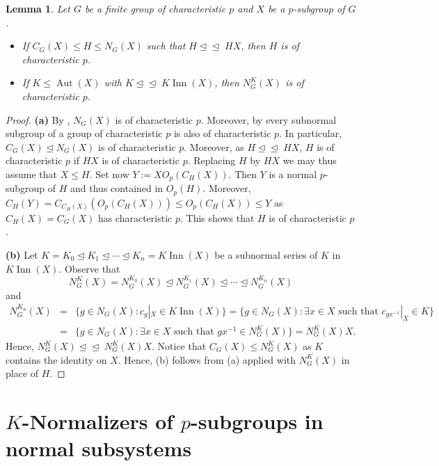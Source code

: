 \documentclass[reqno,11pt]{amsart}
\numberwithin{equation}{section}
\newtheorem{lemma}[equation]{Lemma}
\theoremstyle{definition}
\newcommand{\Aut}{\operatorname{Aut}}
\newcommand{\Inn}{\operatorname{Inn}}
\newcommand{\subn}{\unlhd\!\unlhd\;}
\begin{document}
\begin{lemma}\label{L:KnormalizerInGroup}
 Let $G$ be a finite group of characteristic $p$ and $X$ be a $p$-subgroup of $G$.
\begin{itemize}
 \item [(a)] If $C_G(X)\leq H\leq N_G(X)$ such that $H\subn HX$, then $H$ is of characteristic $p$.
 \item [(b)] If $K\leq \Aut(X)$ with $K\subn K\Inn(X)$, then $N_G^K(X)$ is of characteristic $p$. 
\end{itemize} 
\end{lemma}

\begin{proof}
\textbf{(a)} By \cite[Lemma~1.2(c)]{MS:2012b}, $N_G(X)$ is of characteristic $p$. Moreover, by \cite[Lemma~1.2(a)]{MS:2012b} every subnormal subgroup of a group of characteristic $p$ is also of characteristic $p$. In particular, $C_G(X)\unlhd N_G(X)$ is of characteristic $p$. Moreover, as $H\subn HX$, $H$ is of characteristic $p$ if $HX$ is of characteristic $p$. Replacing $H$ by $HX$ we may thus assume that $X\leq H$. Set now $Y:=XO_p(C_H(X))$. Then $Y$ is a normal $p$-subgroup of $H$ and thus contained in $O_p(H)$. Moreover, $C_H(Y)=C_{C_H(X)}(O_p(C_H(X)))\leq O_p(C_H(X))\leq Y$ as $C_H(X)=C_G(X)$ has characteristic $p$. This shows that $H$ is of characteristic $p$.

\smallskip

\textbf{(b)} Let $K=K_0\unlhd K_1\unlhd\cdots\unlhd K_n=K\Inn(X)$ be a subnormal series of $K$ in $K\Inn(X)$. Observe that
\[N_G^K(X)=N_G^{K_0}(X)\unlhd N_G^{K_1}(X)\unlhd\cdots \unlhd N_G^{K_n}(X)\]
and 
\begin{eqnarray*}
 N_G^{K_n}(X)&=&\{g\in N_G(X)\colon c_g|_X\in K\Inn(X)\}=\{g\in N_G(X)\colon \exists x\in X\mbox{ such that }c_{gx^{-1}}|_X\in K\}\\
&=&\{g\in N_G(X)\colon \exists x\in X\mbox{ such that }gx^{-1}\in N_G^K(X)\}=N_G^K(X)X.
\end{eqnarray*}
Hence, $N_G^K(X)\subn N_G^K(X)X$. Notice that $C_G(X)\leq N_G^K(X)$ as $K$ contains the identity on $X$. Hence, (b) follows from (a) applied with $N_G^K(X)$ in place of $H$. 
\end{proof}









\section{$K$-Normalizers of $p$-subgroups in normal subsystems}
\end{document}
